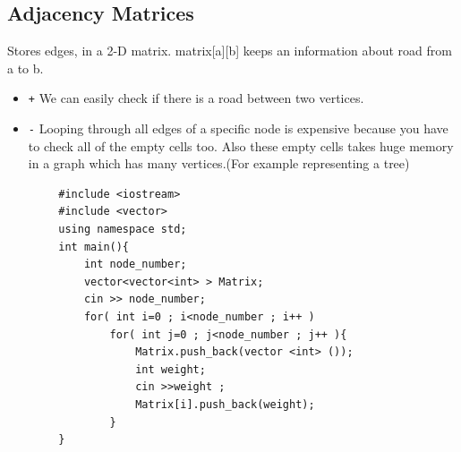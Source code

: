 \documentclass[12pt]{article}
\begin{document}
    \subsection{Adjacency Matrices}
        Stores edges, in a 2-D matrix. matrix[a][b] keeps an information about road from a to b. \cite{16}
        \begin{itemize}
             \item \texttt + We can easily check if there is a road between two vertices.
             \item \texttt - Looping through all edges of a specific node is expensive because you have to check all of the empty cells too. Also these empty cells takes huge memory in a graph which has many vertices.(For example representing a tree)
         \end{itemize}
        \begin{verbatim}
        #include <iostream>
        #include <vector>
        using namespace std;
        int main(){
            int node_number;
            vector<vector<int> > Matrix;
            cin >> node_number;
            for( int i=0 ; i<node_number ; i++ )
                for( int j=0 ; j<node_number ; j++ ){
                    Matrix.push_back(vector <int> ());
                    int weight;
                    cin >>weight ;
                    Matrix[i].push_back(weight);
                }
        }
        \end{verbatim}
\end{document}
